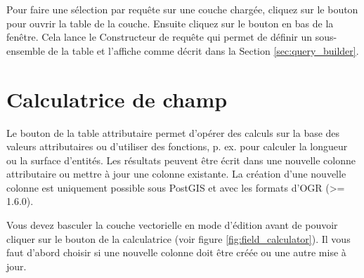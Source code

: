 Pour faire une sélection par requête sur une couche chargée, cliquez sur le bouton\\  pour ouvrir la table de la couche. Ensuite cliquez sur le bouton  en bas de la fenêtre. Cela lance le Constructeur de requête qui permet de définir un sous-ensemble de la table et l'affiche comme décrit dans la Section \ref{sec:query_builder}.

\section{Calculatrice de champ}\label{sec:field_calculator}

Le bouton  de la table attributaire permet d'opérer des calculs sur la base des valeurs attributaires ou d'utiliser des fonctions, p. ex. pour calculer la longueur ou la surface d'entités. Les résultats peuvent être écrit dans une nouvelle colonne attributaire ou mettre à jour une colonne existante. La création d'une nouvelle colonne est uniquement possible sous PostGIS et avec les formats d'OGR (>= 1.6.0).

Vous devez basculer la couche vectorielle en mode d'édition avant de pouvoir cliquer sur le bouton de la calculatrice (voir figure \ref{fig:field_calculator}). Il vous faut d'abord choisir si une nouvelle colonne doit être créée ou une autre mise à jour.


